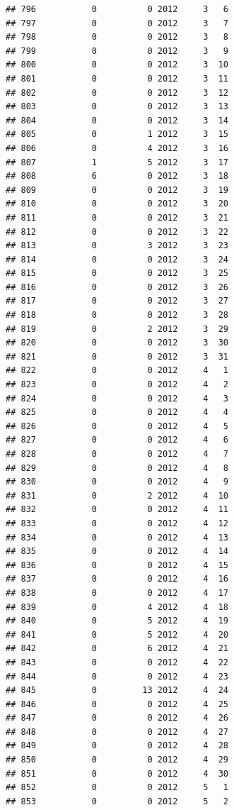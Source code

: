 \documentclass[
]{article}
\begin{document}
\begin{verbatim}
## 796           0          0 2012     3   6
## 797           0          0 2012     3   7
## 798           0          0 2012     3   8
## 799           0          0 2012     3   9
## 800           0          0 2012     3  10
## 801           0          0 2012     3  11
## 802           0          0 2012     3  12
## 803           0          0 2012     3  13
## 804           0          0 2012     3  14
## 805           0          1 2012     3  15
## 806           0          4 2012     3  16
## 807           1          5 2012     3  17
## 808           6          0 2012     3  18
## 809           0          0 2012     3  19
## 810           0          0 2012     3  20
## 811           0          0 2012     3  21
## 812           0          0 2012     3  22
## 813           0          3 2012     3  23
## 814           0          0 2012     3  24
## 815           0          0 2012     3  25
## 816           0          0 2012     3  26
## 817           0          0 2012     3  27
## 818           0          0 2012     3  28
## 819           0          2 2012     3  29
## 820           0          0 2012     3  30
## 821           0          0 2012     3  31
## 822           0          0 2012     4   1
## 823           0          0 2012     4   2
## 824           0          0 2012     4   3
## 825           0          0 2012     4   4
## 826           0          0 2012     4   5
## 827           0          0 2012     4   6
## 828           0          0 2012     4   7
## 829           0          0 2012     4   8
## 830           0          0 2012     4   9
## 831           0          2 2012     4  10
## 832           0          0 2012     4  11
## 833           0          0 2012     4  12
## 834           0          0 2012     4  13
## 835           0          0 2012     4  14
## 836           0          0 2012     4  15
## 837           0          0 2012     4  16
## 838           0          0 2012     4  17
## 839           0          4 2012     4  18
## 840           0          5 2012     4  19
## 841           0          5 2012     4  20
## 842           0          6 2012     4  21
## 843           0          0 2012     4  22
## 844           0          0 2012     4  23
## 845           0         13 2012     4  24
## 846           0          0 2012     4  25
## 847           0          0 2012     4  26
## 848           0          0 2012     4  27
## 849           0          0 2012     4  28
## 850           0          0 2012     4  29
## 851           0          0 2012     4  30
## 852           0          0 2012     5   1
## 853           0          0 2012     5   2

\end{verbatim}
\end{document}
